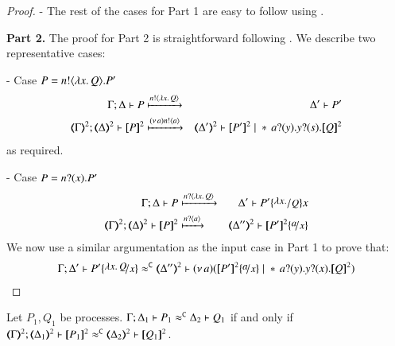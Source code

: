 \begin{proof}
	\noi - The rest of the cases for Part 1 are easy to follow using .

\bigskip
	\noi \textbf{Part 2.} The proof for Part 2 is straightforward following .
	We describe two representative cases:

	\noi - Case $P = n ! \langle \lambda x.\,Q \rangle . P'$
%
	\begin{eqnarray*}
		\horel{\Gamma}{\Delta}{P}{&\hby{\bactout{n}{\abs{x}{Q}}}&}{\Delta'}{P'}\\
		\horel{\tmap{\Gamma}{2}}{\tmap{\Delta}{2}}{\pmap{P}{2}}{& \hby{\news{a} \bactout{n}{a}}&}{\tmap{\Delta'}{2}}{\pmap{P'}{2} \Par \repl{} \binp{a}{y} \binp{y}{s} \pmap{Q}{2}}
	\end{eqnarray*}
%
	\noi as required.

	\noi - Case $P = n ? (x) . P'$
%
	\begin{eqnarray*}
		\horel{\Gamma}{\Delta}{P}{&\hby{\bactinp{n}{\abs{x}{Q}}}&}{\Delta'}{P' \subst{\abs{x}}{Q}}{x}\\
		\horel{\tmap{\Gamma}{2}}{\tmap{\Delta}{2}}{\pmap{P}{2}}{& \hby{\bactinp{n}{a}}&}{\tmap{\Delta''}{2}}{\pmap{P'}{2} \subst{a}{x}}
	\end{eqnarray*}
%
	\noi We now use a similar argumentation as the input case in Part 1 to prove that:
%
	\begin{eqnarray*}
		\horel{\Gamma}{\Delta'}{P' \subst{\abs{x}{Q}}{x}}
		{\fwb}
		{\tmap{\Delta''}{2}}{\newsp{a}{\pmap{P'}{2} \subst{a}{x} \Par \repl{} \binp{a}{y} \binp{y}{x} \pmap{Q}{2}}}
	\end{eqnarray*}
%
\end{proof}

\begin{proposition}\myrm
	\label{app:prop:fulla_HOp_to_p}
	Let $P_1, Q_1$ be \HOp processes.
	$\Gamma; \Delta_1 \vdash P_1 \approx^\mathtt{C} \Delta_2 \vdash Q_1$
	if and only if
	$\horel{\tmap{\Gamma}{2}}{\tmap{\Delta_1}{2}}{\pmap{P_1}{2}}{\fwb}{\tmap{\Delta_2}{2}}{\pmap{Q_1}{2}}$.
\end{proposition}

